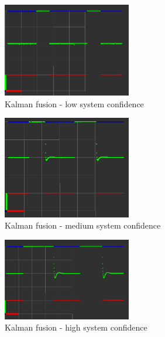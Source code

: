 \begin{figure}[thpb]
      \centering
      \includegraphics[width=0.5\textwidth]{graphics/kalman_fast.png}
      \caption{Kalman fusion - low system confidence}
      \label{Fig: Kalman Fusion - Low}
   \end{figure}

\begin{figure}[thpb]
      \centering
      \includegraphics[width=0.5\textwidth]{graphics/kalman_medium.png}
      \caption{Kalman fusion - medium system confidence}
      \label{Fig: Kalman Fusion - Medium}
   \end{figure}
	
\begin{figure}[thpb]
      \centering
      \includegraphics[width=0.5\textwidth]{graphics/kalman_slow.png}
      \caption{Kalman fusion - high system confidence}
      \label{Fig: Kalman Fusion - High}
   \end{figure}

